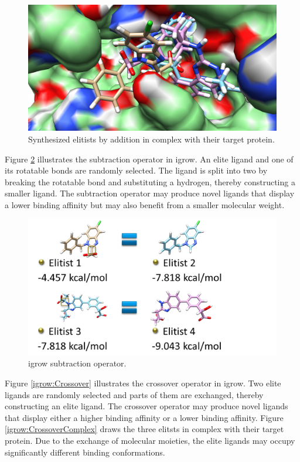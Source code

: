 \documentclass[10pt, conference, compsocconf]{IEEEtran}
\begin{document}
\begin{figure}
\centering
\includegraphics[width=\textwidth]{../igrow/AdditionComplex.png}
\caption{Synthesized elitists by addition in complex with their target protein.}
\label{igrow:AdditionComplex}
\end{figure}

Figure \ref{igrow:Subtraction} illustrates the subtraction operator in igrow. An elite ligand and one of its rotatable bonds are randomly selected. The ligand is split into two by breaking the rotatable bond and substituting a hydrogen, thereby constructing a smaller ligand. The subtraction operator may produce novel ligands that display a lower binding affinity but may also benefit from a smaller molecular weight.

\begin{figure}
\centering
\includegraphics[width=\textwidth]{../igrow/Subtraction.png}
\caption{igrow subtraction operator.}
\label{igrow:Subtraction}
\end{figure}

Figure \ref{igrow:Crossover} illustrates the crossover operator in igrow. Two elite ligands are randomly selected and parts of them are exchanged, thereby constructing an elite ligand. The crossover operator may produce novel ligands that display either a higher binding affinity or a lower binding affinity. Figure \ref{igrow:CrossoverComplex} draws the three elitsts in complex with their target protein. Due to the exchange of molecular moieties, the elite ligands may occupy significantly different binding conformations.
\end{document}
